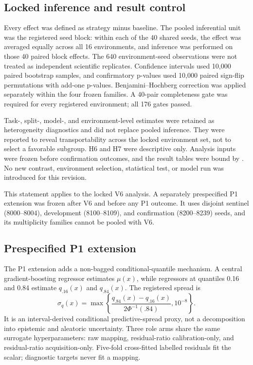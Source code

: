 \documentclass[10pt,twocolumn]{article}
\begin{document}
\subsection{Locked inference and result control}
Every effect was defined as strategy minus baseline. The pooled inferential
unit was the registered seed block: within each of the 40 shared seeds, the
effect was averaged equally across all 16 environments, and inference was
performed on those 40 paired block effects. The 640 environment-seed
observations were not treated as independent scientific replicates.
Confidence intervals used 10,000 paired bootstrap samples, and confirmatory
p-values used 10,000 paired sign-flip permutations with add-one p-values.
Benjamini--Hochberg correction was applied separately within the four frozen
families. A 40-pair completeness gate was required for every registered
environment; all 176 gates passed.

Task-, split-, model-, and environment-level estimates were retained as
heterogeneity diagnostics and did not replace pooled inference. They were
reported to reveal transportability across the locked environment set, not to
select a favorable subgroup. H6 and H7 were descriptive only. Analysis inputs
were frozen before confirmation outcomes, and the result tables were bound by
. No new
contrast, environment selection, statistical test, or model run was
introduced for this revision.

This statement applies to the locked V6 analysis. A separately prespecified
P1 extension was frozen after V6 and before any P1 outcome. It uses disjoint
sentinel (8000--8004), development (8100--8109), and confirmation
(8200--8239) seeds, and its multiplicity families cannot be pooled with V6.

\subsection{Prespecified P1 extension}
The P1 extension adds a non-bagged conditional-quantile mechanism. A central
gradient-boosting regressor estimates $\mu(x)$, while regressors at quantiles
0.16 and 0.84 estimate $q_{.16}(x)$ and $q_{.84}(x)$. The registered spread is
\begin{equation}
 \sigma_q(x)=\max\left\{\frac{q_{.84}(x)-q_{.16}(x)}
 {2\Phi^{-1}(.84)},10^{-8}\right\}.
\end{equation}
It is an interval-derived conditional predictive-spread proxy, not a
decomposition into epistemic and aleatoric uncertainty. Three role arms share
the same surrogate hyperparameters: raw mapping, residual-ratio
calibration-only, and residual-ratio acquisition-only. Five-fold cross-fitted
labelled residuals fit the scalar; diagnostic targets never fit a mapping.
\end{document}

